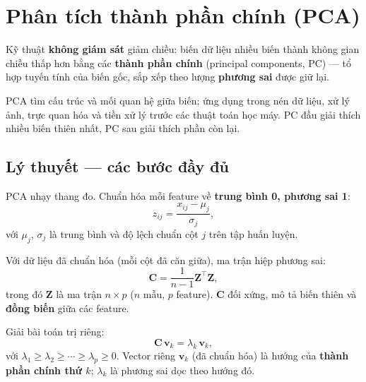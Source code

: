 \section{Phân tích thành phần chính (PCA)}
\label{sec:principal-component-analysis}

\begin{dinhnghia}[title={PCA (Principal Component Analysis)}]
Kỹ thuật \textbf{không giám sát} giảm chiều: biến dữ liệu nhiều biến thành không gian chiều thấp hơn bằng các \textbf{thành phần chính} (principal components, PC) --- tổ hợp tuyến tính của biến gốc, sắp xếp theo lượng \textbf{phương sai} được giữ lại.
\end{dinhnghia}

\begin{ynghia}[title={Vai trò}]
PCA tìm cấu trúc và mối quan hệ giữa biến; ứng dụng trong nén dữ liệu, xử lý ảnh, trực quan hóa và tiền xử lý trước các thuật toán học máy. PC đầu giải thích nhiều biến thiên nhất, PC sau giải thích phần còn lại.
\end{ynghia}

\subsection{Lý thuyết --- các bước đầy đủ}

\begin{phuongphap}[title={Bước 1: Chuẩn hóa dữ liệu}]
PCA nhạy thang đo. Chuẩn hóa mỗi feature về \textbf{trung bình 0, phương sai 1}:
\[
z_{ij} = \frac{x_{ij} - \mu_j}{\sigma_j},
\]
với $\mu_j$, $\sigma_j$ là trung bình và độ lệch chuẩn cột $j$ trên tập huấn luyện.
\end{phuongphap}

\begin{phuongphap}[title={Bước 2: Ma trận hiệp phương sai}]
Với dữ liệu đã chuẩn hóa (mỗi cột đã căn giữa), ma trận hiệp phương sai:
\[
\mathbf{C} = \frac{1}{n-1}\mathbf{Z}^{\top}\mathbf{Z},
\]
trong đó $\mathbf{Z}$ là ma trận $n \times p$ ($n$ mẫu, $p$ feature). $\mathbf{C}$ đối xứng, mô tả biến thiên và \textbf{đồng biến} giữa các feature.
\end{phuongphap}

\begin{phuongphap}[title={Bước 3: Trị riêng và vector riêng}]
Giải bài toán trị riêng:
\[
\mathbf{C}\,\mathbf{v}_k = \lambda_k\,\mathbf{v}_k,
\]
với $\lambda_1 \geq \lambda_2 \geq \cdots \geq \lambda_p \geq 0$. Vector riêng $\mathbf{v}_k$ (đã chuẩn hóa) là hướng của \textbf{thành phần chính thứ $k$}; $\lambda_k$ là phương sai dọc theo hướng đó.
\end{phuongphap}


